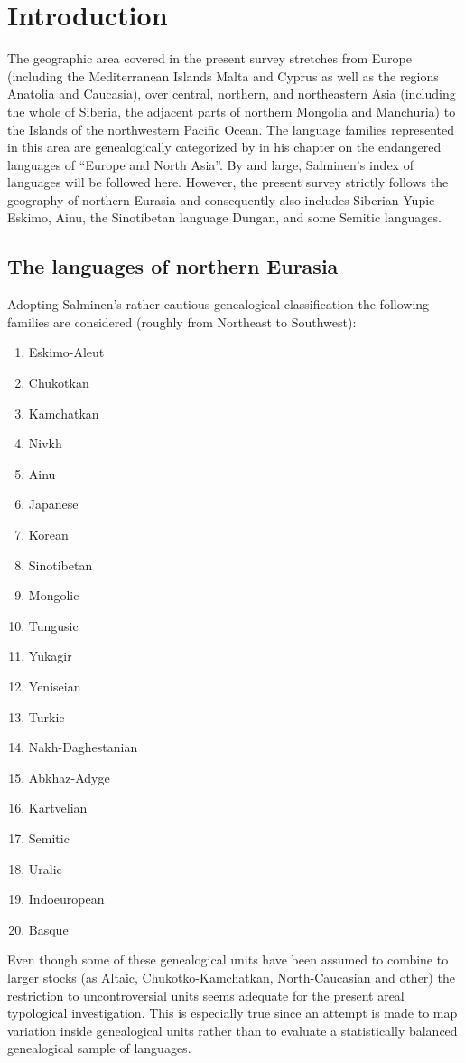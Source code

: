 
\chapter{Introduction}
The geographic area covered in the present survey stretches from Europe (including the Mediterranean Islands Malta and Cyprus as well as the regions Anatolia and Caucasia), over central, northern, and northeastern Asia (including the whole of Siberia, the adjacent parts of northern Mongolia and Manchuria) to the Islands of the northwestern Pacific Ocean. The language families represented in this area are genealogically categorized by \cite{salminen2007} in his chapter on the endangered languages of “Europe and North Asia”. By and large, Salminen's index of languages will be followed here. However, the present survey strictly follows the geography of northern Eurasia and consequently also includes Siberian Yupic Eskimo, Ainu, the Sinotibetan language Dungan, and some Semitic languages.

\section{The languages of northern Eurasia}
Adopting Salminen's rather cautious genealogical classification the following families are considered (roughly from Northeast to Southwest):
\begin{multicols}{2}
\begin{enumerate}
\item{Eskimo-Aleut}
\item{Chukotkan}
\item{Kamchatkan}
\item{Nivkh}
\item{Ainu}
\item{Japanese}
\item{Korean}
\item{Sinotibetan}
\item{Mongolic}
\item{Tungusic}
\item{Yukagir}
\item{Yeniseian}
\item{Turkic}
\item{Nakh-Daghestanian}
\item{Abkhaz-Adyge}
\item{Kartvelian}
\item{Semitic}
\item{Uralic}
\item{Indoeuropean}
\item{Basque}
\end{enumerate}
\end{multicols}
Even though some of these genealogical units have been assumed to combine to larger stocks (as Altaic, Chukotko-Kamchatkan, North-Caucasian and other) the restriction to uncontroversial units seems adequate for the present areal typological investigation. This is especially true since an attempt is made to map variation inside genealogical units rather than to evaluate a statistically balanced genealogical sample of languages.

